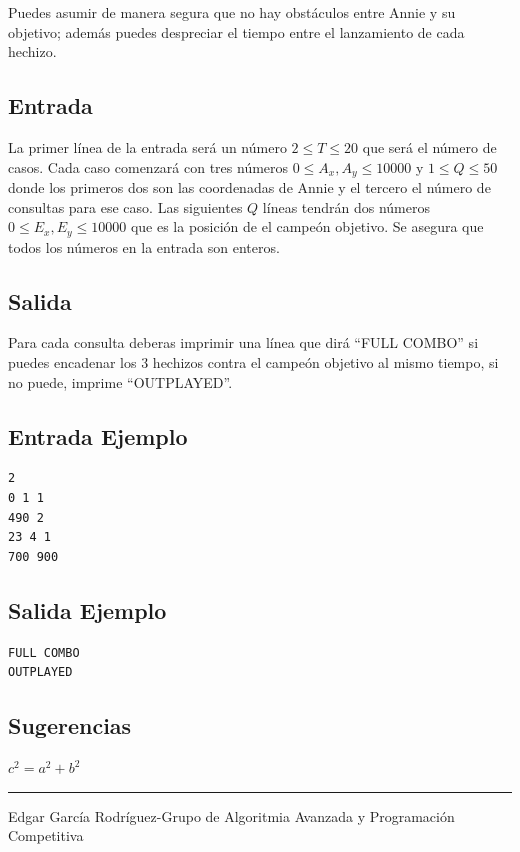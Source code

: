 \documentclass[letter,10pt]{article}
\newcommand{\lyxaddress}[1]{
\par {\raggedright #1
\vspace{1.4em}
\noindent\par}
}
\begin{document}
Puedes asumir de manera segura que no hay obstáculos entre Annie y su objetivo; además
puedes despreciar el tiempo entre el lanzamiento de cada hechizo.

\subsection*{Entrada}

La primer línea de la entrada será un número $2 \leq T \leq 20$ que será el número de casos.
Cada caso comenzará con tres números $ 0 \leq A_x , A_y \leq 10000$ y $1 \leq Q \leq 50$ donde los primeros dos son 
las coordenadas de Annie y el tercero el número de consultas para ese caso.
Las siguientes $Q$ líneas tendrán dos números $ 0 \leq E_x,  E_y  \leq 10000$ que es la posición de el 
campeón objetivo.
Se  asegura que todos los números en la entrada son enteros.

\subsection*{Salida}

Para cada consulta deberas imprimir una línea que dirá ``FULL COMBO'' si puedes 
encadenar los 3 hechizos contra el campeón objetivo al mismo tiempo, si no puede, imprime 
``OUTPLAYED''.

\subsection*{Entrada Ejemplo}

\begin{verbatim}
2
0 1 1
490 2
23 4 1
700 900 
\end{verbatim}

\subsection*{Salida Ejemplo}

\begin{verbatim}
FULL COMBO
OUTPLAYED
\end{verbatim}

\subsection*{Sugerencias}

$c^2 = a^2 + b^2$

\noindent \rule[0.5ex]{1\columnwidth}{1pt}


\lyxaddress{Edgar García Rodríguez-Grupo de Algoritmia Avanzada y Programación Competitiva}
\end{document}
